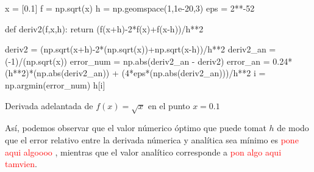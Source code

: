 \documentclass[../portafolio.tex]{subfiles}
\begin{document}
	\begin{listing}
		\begin{pythoncode}
x = [0.1]
f = np.sqrt(x)
h = np.geomspace(1,1e-20,3)
eps = 2**-52

def deriv2(f,x,h):
    return (f(x+h)-2*f(x)+f(x-h))/h**2 

deriv2 = (np.sqrt(x+h)-2*(np.sqrt(x))+np.sqrt(x-h))/h**2
deriv2_an = (-1)/(np.sqrt(x))
error_num = np.abs(deriv2_an - deriv2)
error_an = 0.24*(h**2)*(np.abs(deriv2_an)) + (4*eps*(np.abs(deriv2_an)))/h**2
i = np.argmin(error_num)
h[i]		
		\end{pythoncode}
		\caption{Derivada adelantada de $f(x)= \sqrt{x}$ en el punto $x=0.1$}
		\label{cod:deriv2}
	\end{listing}
As\'i, podemos observar que el valor n\'umerico \'optimo que puede tomat $h$ de modo que el error relativo entre la derivada n\'umerica y anal\'itica sea m\'inimo es \textcolor{red}{pone aqui algoooo} , mientras que el valor anal\'itico corresponde a \textcolor{red}{pon algo aqui tamvien}. \\
\end{document}
